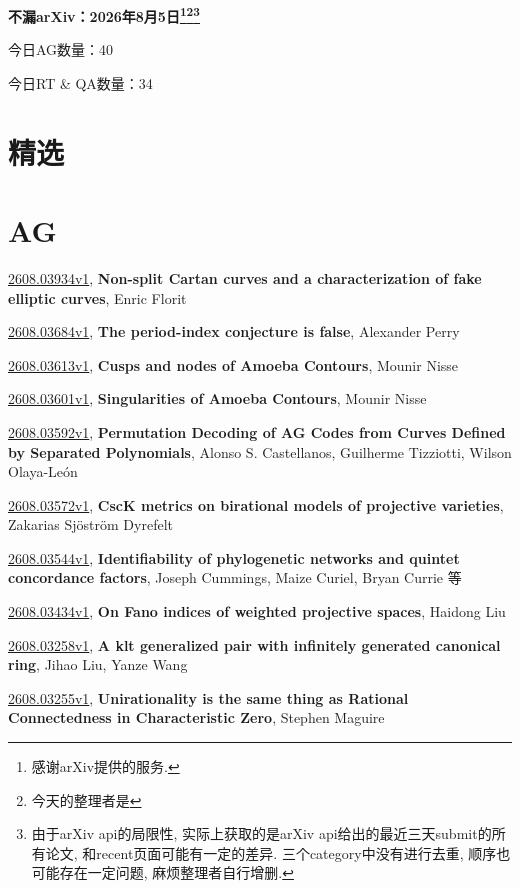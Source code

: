 \documentclass[9pt, a4paper]{article}
\theoremstyle{plain}
\theoremstyle{definition}
\theoremstyle{remark}
\newcommand{\arxiv}[3]{\href{https://arxiv.org/abs/#1}{#1}, \textbf{\textcolor{arxivblue}{#2}}, #3}
\newcommand{\AGnumber}{40}
\newcommand{\RTQAnumber}{34}
\newcommand{\NewestDate}{2026年8月5日}
\newcommand{\todayarXiver}{} %
\begin{document}
\begin{center}
    \Huge\textbf{不漏arXiv：\NewestDate\footnote{感谢arXiv提供的服务.}\footnote{今天的整理者是\todayarXiver}\footnote{由于arXiv api的局限性, 实际上获取的是arXiv api给出的最近三天submit的所有论文, 和recent页面可能有一定的差异. 三个category中没有进行去重, 顺序也可能存在一定问题, 麻烦整理者自行增删.}} \\
\end{center}

\setcounter{section}{-1}

\begin{center}
    今日AG数量：\AGnumber
    
    今日RT \& QA数量：\RTQAnumber
    
\end{center}


\section{精选}


\section{AG}
\arxiv{2608.03934v1}{Non-split Cartan curves and a characterization of fake elliptic curves}{Enric Florit}

\arxiv{2608.03684v1}{The period-index conjecture is false}{Alexander Perry}

\arxiv{2608.03613v1}{Cusps and nodes of Amoeba Contours}{Mounir Nisse}

\arxiv{2608.03601v1}{Singularities of Amoeba Contours}{Mounir Nisse}

\arxiv{2608.03592v1}{Permutation Decoding of AG Codes from Curves Defined by Separated Polynomials}{Alonso S. Castellanos, Guilherme Tizziotti, Wilson Olaya-León}

\arxiv{2608.03572v1}{CscK metrics on birational models of projective varieties}{Zakarias Sjöström Dyrefelt}

\arxiv{2608.03544v1}{Identifiability of phylogenetic networks and quintet concordance factors}{Joseph Cummings, Maize Curiel, Bryan Currie 等}

\arxiv{2608.03434v1}{On Fano indices of weighted projective spaces}{Haidong Liu}

\arxiv{2608.03258v1}{A klt generalized pair with infinitely generated canonical ring}{Jihao Liu, Yanze Wang}

\arxiv{2608.03255v1}{Unirationality is the same thing as Rational Connectedness in Characteristic Zero}{Stephen Maguire}
\end{document}
